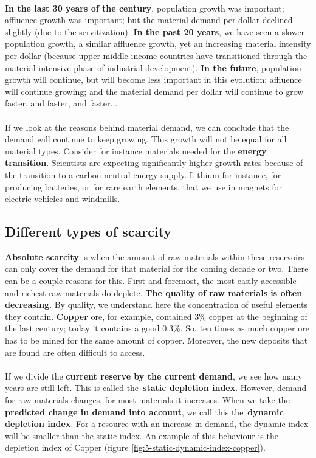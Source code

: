 \documentclass[../summary.tex]{subfiles}
\begin{document}
	\ \\
	\textbf{In the last 30 years of the  century}, population growth was important; affluence growth was important; but the material demand per dollar declined slightly (due to the servitization). \textbf{In the past 20 years}, we have seen a slower population growth, a similar affluence growth, yet an increasing material intensity per dollar (because upper-middle income countries have transitioned through the material intensive phase of industrial development). \textbf{In the future}, population growth will continue, but will become less important in this evolution; affluence will continue growing; and the material demand per dollar will continue to grow faster, and faster, and faster...
	\\
	\\
	If we look at the reasons behind material demand, we can conclude that the demand will continue to keep growing. This growth will not be equal for all material types. Consider for instance materials needed for the \textbf{energy transition}. Scientists are expecting significantly higher growth rates because of the transition to a carbon neutral energy supply. Lithium for instance, for producing batteries, or for rare earth elements, that we use in magnets for electric vehicles and windmills.
	
	\subsection{Different types of scarcity}
	
	\textbf{Absolute scarcity} is when the amount of raw materials within these reservoirs can only cover the demand for that material for the coming decade or two. There can be a couple reasons for this. First and foremost, the most easily accessible and richest raw materials do deplete. \textbf{The quality of raw materials is often decreasing}. By quality, we understand here the concentration of useful elements they contain. \textbf{Copper} ore, for example, contained 3\% copper at the beginning of the last century; today it contains a good 0.3\%. So, ten times as much copper ore has to be mined for the same amount of copper. Moreover, the new deposits that are found are often difficult to access.
	\\\\
	If we divide the \textbf{current reserve by the current demand}, we see how many years are still left. This is called the \textbf{static depletion index}. However, demand for raw materials changes, for most materials it increases. When we take the \textbf{predicted change in demand into account}, we call this the \textbf{dynamic depletion index}. For a resource with an increase in demand, the dynamic index will be smaller than the static index. An example of this behaviour is the depletion index of Copper (figure \ref{fig:5-static-dynamic-index-copper}).
	
\end{document}
